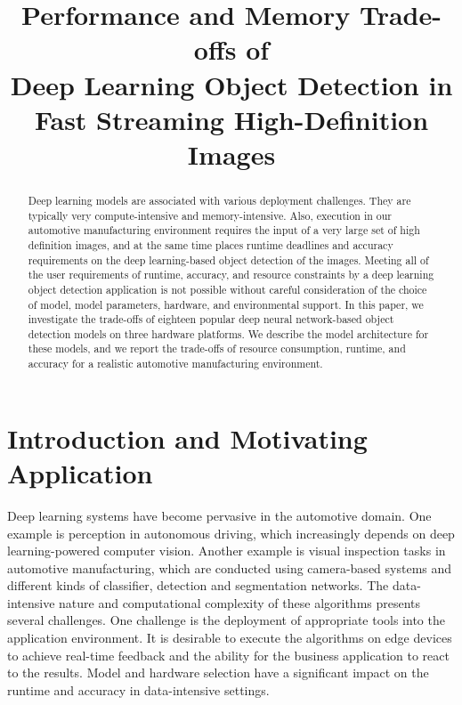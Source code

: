 \documentclass[conference]{IEEEtran}
\begin{document}

\title{Performance and Memory Trade-offs of \\ Deep Learning Object Detection in \\ Fast Streaming High-Definition Images}


\maketitle

\thispagestyle{plain}
\pagestyle{plain}



\begin{abstract}
Deep learning models are associated with various deployment challenges. They are typically very compute-intensive and memory-intensive.
Also, execution in our automotive manufacturing environment requires the input of a very large set of high definition images, and at the same time places runtime deadlines and accuracy requirements on the deep learning-based object detection of the images.
Meeting all of the user requirements of runtime, accuracy, and resource constraints by a deep learning object detection application is not possible without careful consideration of the choice of model, model parameters, hardware, and environmental support.
In this paper, we investigate the trade-offs of eighteen popular deep neural network-based object detection models on three hardware platforms. 
We describe the model architecture for these models, and
we report the trade-offs of resource consumption, runtime, and accuracy for a realistic automotive manufacturing environment.
\end{abstract}


\IEEEpeerreviewmaketitle

\nocite{*}

\section{Introduction and Motivating Application}

Deep learning systems have become pervasive in the automotive domain.
One example is  perception in autonomous driving, which increasingly depends on deep learning-powered computer vision. 
Another example is visual inspection tasks in automotive manufacturing, which are conducted using camera-based systems and different kinds of classifier, detection and segmentation networks. 
The data-intensive nature and computational complexity of these algorithms presents several challenges.
One challenge is the deployment of appropriate tools into the application environment. 
It is desirable to execute the algorithms on edge devices to achieve  real-time feedback and the ability for the business application to react to the results. 
Model and hardware selection have a significant impact on the runtime and accuracy in data-intensive settings.
\end{document}
